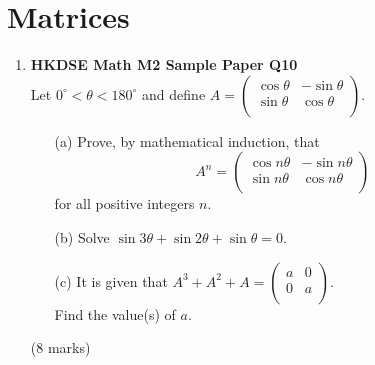 \documentclass{report}
\begin{document}
\chapter{Matrices}
\begin{enumerate}
	\item \textbf{HKDSE Math M2 Sample Paper Q10}\\
	Let $0^{\circ} < \theta < 180^{\circ}$ and define $A = \begin{pmatrix}\cos{\theta}&-\sin{\theta}\\\sin{\theta}&\cos{\theta}\\\end{pmatrix}$. 
	\begin{enumerate}
		\item [(a)]Prove, by mathematical induction, that
		$$A^n = \begin{pmatrix}\cos{n\theta}&-\sin{n\theta}\\\sin{n\theta}&\cos{n\theta}\\\end{pmatrix}$$ for all positive integers $n$.
		\item [(b)]Solve $\sin{3\theta} + \sin{2\theta} + \sin{\theta} = 0$.
		\item [(c)]It is given that $A^3 + A^2 + A = \begin{pmatrix}a&0\\0&a\\\end{pmatrix}$.\\Find the value(s) of $a$. 
	\end{enumerate}
	(8 marks)


\end{enumerate}
\end{document}

